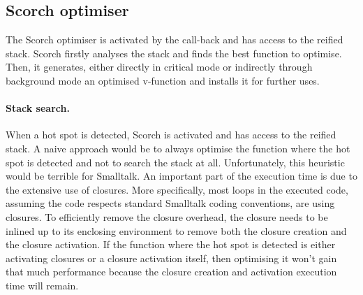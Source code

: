 \documentclass[a4paper,12pt,twoside]{../includes/ThesisStyle}
\begin{document}



\subsection{Scorch optimiser}

The Scorch optimiser is activated by the call-back and has access to the reified stack. Scorch firstly analyses the stack and finds the best function to optimise. Then, it generates, either directly in critical mode or indirectly through background mode an optimised v-function and installs it for further uses.


\paragraph{Stack search.}
\label{ss:stackSearch}

When a hot spot is detected, Scorch is activated and has access to the reified stack. A naive approach would be to always optimise the function where the hot spot is detected and not to search the stack at all. Unfortunately, this heuristic would be terrible for Smalltalk. An important part of the execution time is due to the extensive use of closures. More specifically, most loops in the executed code, assuming the code respects standard Smalltalk coding conventions, are using closures. To efficiently remove the closure overhead, the closure needs to be inlined up to its enclosing environment to remove both the closure creation and the closure activation. If the function where the hot spot is detected is either activating closures or a closure activation itself, then optimising it won't gain that much performance because the closure creation and activation execution time will remain.
\end{document}

